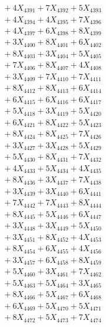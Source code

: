 \documentclass[a4paper,10pt]{article}
\begin{document}
{\begin{align}
&\;  + 4 X_{4391} + 7 X_{4392} + 5 X_{4393} \\[0.3ex]
&\;  + 4 X_{4394} + 4 X_{4395} + 7 X_{4396} \\[0.3ex]
&\;  + 4 X_{4397} + 6 X_{4398} + 8 X_{4399} \\[0.3ex]
&\;  + 3 X_{4400} + 8 X_{4401} + 6 X_{4402} \\[0.3ex]
&\;  + 8 X_{4403} + 3 X_{4404} + 5 X_{4405} \\[0.3ex]
&\;  + 7 X_{4406} + 8 X_{4407} + 4 X_{4408} \\[0.3ex]
&\;  + 3 X_{4409} + 7 X_{4410} + 7 X_{4411} \\[0.3ex]
&\;  + 8 X_{4412} + 8 X_{4413} + 6 X_{4414} \\[0.3ex]
&\;  + 6 X_{4415} + 6 X_{4416} + 6 X_{4417} \\[0.3ex]
&\;  + 5 X_{4418} + 3 X_{4419} + 5 X_{4420} \\[0.5ex]\allowbreak
&\;  + 6 X_{4421} + 8 X_{4422} + 5 X_{4423} \\[0.3ex]
&\;  + 8 X_{4424} + 8 X_{4425} + 7 X_{4426} \\[0.3ex]
&\;  + 3 X_{4427} + 3 X_{4428} + 5 X_{4429} \\[0.3ex]
&\;  + 5 X_{4430} + 8 X_{4431} + 7 X_{4432} \\[0.3ex]
&\;  + 4 X_{4433} + 5 X_{4434} + 4 X_{4435} \\[0.3ex]
&\;  + 8 X_{4436} + 3 X_{4437} + 7 X_{4438} \\[0.3ex]
&\;  + 3 X_{4439} + 3 X_{4440} + 6 X_{4441} \\[0.3ex]
&\;  + 7 X_{4442} + 7 X_{4443} + 8 X_{4444} \\[0.3ex]
&\;  + 8 X_{4445} + 5 X_{4446} + 6 X_{4447} \\[0.3ex]
&\;  + 3 X_{4448} + 3 X_{4449} + 5 X_{4450} \\[0.5ex]\allowbreak
&\;  + 3 X_{4451} + 8 X_{4452} + 4 X_{4453} \\[0.3ex]
&\;  + 8 X_{4454} + 6 X_{4455} + 4 X_{4456} \\[0.3ex]
&\;  + 3 X_{4457} + 6 X_{4458} + 8 X_{4459} \\[0.3ex]
&\;  + 5 X_{4460} + 3 X_{4461} + 7 X_{4462} \\[0.3ex]
&\;  + 5 X_{4463} + 5 X_{4464} + 3 X_{4465} \\[0.3ex]
&\;  + 8 X_{4466} + 5 X_{4467} + 6 X_{4468} \\[0.3ex]
&\;  + 6 X_{4469} + 5 X_{4470} + 5 X_{4471} \\[0.3ex]
&\;  + 8 X_{4472} + 5 X_{4473} + 7 X_{4474} \\[0.3ex]

\end{align}}
\end{document}
